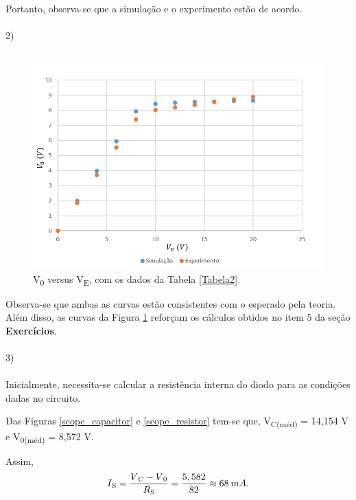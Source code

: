 \documentclass[journal, a4paper]{IEEEtran}
\begin{document}
   \tab Portanto, observa-se que a simulação e o experimento estão de acordo. 
\\~\\    
    2) 
\\~\\    
         \begin{figure}[H]
		    \begin{center}
		    \includegraphics[width=\columnwidth]{Curva_exercicio2.png}
    		\caption{V\textsubscript{0} versus V\textsubscript{E}, com os dados da Tabela \ref{Tabela2}}
		    \label{curva2}
		    \end{center}
	    \end{figure}
    
    \tab Observa-se que ambas as curvas estão consistentes com o esperado pela teoria. Além disso, as curvas da Figura \ref{curva2} reforçam os cálculos obtidos no item 5 da seção \textbf{Exercícios}.  
\\~\\    
    3)
\\~\\

    \tab Inicialmente, necessita-se calcular a resistência interna do diodo para as condições dadas no circuito.
    
    \tab Das Figuras \ref{scope_capacitor} e \ref{scope_resistor} tem-se que, V\textsubscript{C(méd)} = 14,154 V e V\textsubscript{0(méd)} = 8,572 V. 
   
    \tab Assim, 
        \begin{equation}
            I\textsubscript{S} = \frac{ V\textsubscript{C}-  V\textsubscript{0}}{ R\textsubscript{S}} = \frac{5,582}{82} \approx 68 \: mA.
        \end{equation}
    
\end{document}
